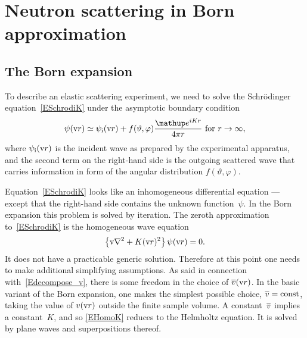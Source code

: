 %
%

\section{Neutron scattering in Born approximation}\label{SBornApprox}

\subsection{The Born expansion}\label{SBornExpans}

%

To describe an elastic scattering experiment,
we need to solve the Schrödinger equation~\cref{ESchrodiK}
under the asymptotic boundary condition
%
\begin{equation}\label{Escabouco}
  \psi(\r)
  \simeq \psi_\si(\r) + f(\vartheta,\varphi)\frac{\e^{iKr}}{4\pi r}
  \text{~for~}r\to\infty,
\end{equation}
%
%
%
where $\psi_{\text{i}}(\text{v}{r})$ is the incident wave
as prepared by the experimental apparatus,
and the second term on the right-hand side is
the outgoing scattered wave
that carries information in form of the angular distribution
$f(\vartheta,\varphi)$.

Equation~\cref{ESchrodiK} looks
like an inhomogeneous differential equation ---
except that the right-hand side contains the unknown function~$\psi$.
In the Born expansion this problem is solved by iteration.
The zeroth approximation to~\cref{ESchrodiK} is the homogeneous wave equation
\begin{equation}\label{EHomoK}
  \left\{\text{v}{\nabla}^2+K(\text{v}{r})^2\right\}\psi(\text{v}{r}) = 0.
\end{equation}
It does not have a practicable generic solution.
Therefore at this point one needs to make additional simplifying assumptions.
As said in connection with~\cref{Edecompose_v},
there is some freedom in the choice of $\overline{v}(\text{v}{r})$.
In the basic variant of the Born expansion,
one makes the simplest possible choice, $\overline{v}=\text{const}$,
taking the value of $v(\text{v}{r})$ outside the finite sample volume.
A constant~$\overline{v}$ implies a constant~$K$,
and so \cref{EHomoK} reduces to the Helmholtz equation.
%
%
It is solved by plane waves and superpositions thereof.

